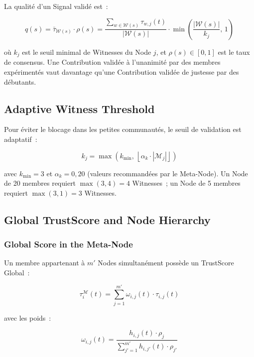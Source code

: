 \documentclass[12pt,a4paper]{article}
\theoremstyle{definition}
\theoremstyle{plain}
\theoremstyle{remark}
\newcommand{\trustscore}{\tau}
\newcommand{\1}{\mathbf{1}}
\begin{document}
La qualité d'un Signal validé est~:

\begin{equation}
q(s) = \bar{\trustscore}_{\mathcal{W}(s)} \cdot \rho(s)
= \frac{\sum_{w \in \mathcal{W}(s)} \trustscore_{w,j}(t)}{|\mathcal{W}(s)|}
\cdot \min\!\left(\frac{|\mathcal{W}(s)|}{k_j},\, 1\right)
\label{eq:quality}
\end{equation}

où $k_j$ est le seuil minimal de Witnesses du Node $j$, et $\rho(s) \in [0,1]$
est le taux de consensus. Une Contribution validée à l'unanimité par des
membres expérimentés vaut davantage qu'une Contribution validée de justesse par
des débutants.

\subsection{Adaptive Witness Threshold}

Pour éviter le blocage dans les petites communautés, le seuil de validation est
adaptatif~:

\begin{equation}
k_j = \max\!\left(k_{\min},\, \left\lfloor \alpha_k \cdot |\mathcal{M}_j| \right\rfloor\right)
\label{eq:k}
\end{equation}

avec $k_{\min} = 3$ et $\alpha_k = 0{,}20$ (valeurs recommandées par le
Meta-Node). Un Node de 20 membres requiert $\max(3, 4) = 4$ Witnesses~; un
Node de 5 membres requiert $\max(3, 1) = 3$ Witnesses.

\subsection{Global TrustScore and Node Hierarchy}

\subsubsection{Global Score in the Meta-Node}

Un membre appartenant à $m'$ Nodes simultanément possède un TrustScore Global~:

\begin{equation}
\trustscore_i^{\mathcal{M}}(t)
= \sum_{j=1}^{m'} \omega_{i,j}(t) \cdot \trustscore_{i,j}(t)
\label{eq:global}
\end{equation}

avec les poids~:

\begin{equation}
\omega_{i,j}(t) = \frac{h_{i,j}(t) \cdot \rho_j}{\displaystyle\sum_{j'=1}^{m'} h_{i,j'}(t) \cdot \rho_{j'}}
\label{eq:omega}
\end{equation}
\end{document}
